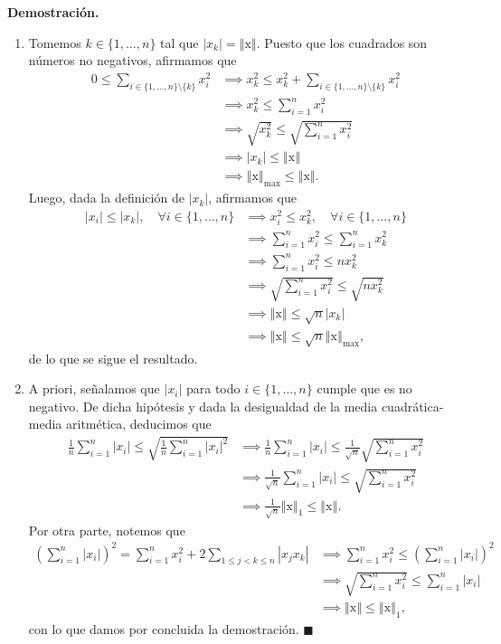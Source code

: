 \documentclass[12pt]{article}
\newcommand{\abs}[1]{\left\vert#1\right\vert}
\newcommand{\norm}[1]{\left\Vert#1\right\Vert}
\newcommand{\x}{\mathrm x}
\begin{document}
\begin{enumerate}
\textbf{Demostración.}
\begin{enumerate}[(1)]
    \item Tomemos $k \in \{1,\ldots,n\}$ tal que $\abs{x_k}=\norm{\x}$. Puesto que los cuadrados son números
    no negativos, afirmamos que
    \begin{align*}
        0 \leq \sum_{i\in \{1,\ldots,n\}\setminus \{k\}}x_{i}^2 &\implies x_k^2 \leq x_k^2 + \sum_{i\in \{1,\ldots,n\}\setminus \{k\}}x_{i}^2 \\
        &\implies x_{k}^2 \leq \sum_{i=1}^{n}x_i^2 \\
        &\implies \sqrt{x_{k}^2} \leq \sqrt{\sum_{i=1}^{n}x_i^2} \\
        &\implies \abs{x_{k}} \leq \norm{\x} \\
        &\implies \norm{\x}_{\max} \leq \norm{\x}.
    \end{align*}
    Luego, dada la definición de $\abs{x_k}$, afirmamos que
    \begin{align*}
        \abs{x_i}\leq \abs{x_k}, \quad \forall i \in \{1,\ldots,n\} &\implies  x_i^2\leq  x_k^2, \quad \forall i \in \{1,\ldots,n\}\\
        &\implies \sum_{i=1}^{n}x_i^2 \leq \sum_{i=1}^{n}x_k^2 \\
        &\implies \sum_{i=1}^{n}x_i^2 \leq nx_k^2 \\
        &\implies \sqrt{\sum_{i=1}^{n}x_i^2} \leq \sqrt{nx_k^2} \\
        &\implies \norm{\x} \leq \sqrt{n}\abs{x_k} \\
        &\implies \norm{\x} \leq \sqrt{n}\norm{\x}_{\max},
    \end{align*}
    de lo que se sigue el resultado.
    \item A priori, señalamos que $\abs{x_i}$ para todo $i \in \{1,\ldots,n\}$ cumple que es no negativo. De dicha hipótesis y dada la desigualdad de la media cuadrática-media
    aritmética, deducimos que
    \begin{align*}
        \frac{1}{n}\sum_{i=1}^{n}\abs{x_i} \leq \sqrt{\frac{1}{n}\sum_{i=1}^{n}\abs{x_i}^2} &\implies \frac{1}{n}\sum_{i=1}^{n}\abs{x_i} \leq \frac{1}{\sqrt{n}}\sqrt{\sum_{i=1}^{n}x_i^2}\\
        &\implies \frac{1}{\sqrt{n}}\sum_{i=1}^{n}\abs{x_i} \leq \sqrt{\sum_{i=1}^{n}x_i^2} \\
        &\implies \frac{1}{\sqrt{n}}\norm{\x}_1 \leq \norm{\x}.
    \end{align*}
    Por otra parte, notemos que
    \begin{align*}
        \left(\sum_{i=1}^{n}\abs{x_i}\right)^2 = \sum_{i=1}^{n}x_i^2 + 2\sum_{1\leq j<k\leq n}\abs{x_jx_k} &\implies \sum_{i=1}^{n}x_i^2 \leq \left(\sum_{i=1}^{n}\abs{x_i}\right)^2\\
        &\implies \sqrt{\sum_{i=1}^{n}x_i^2} \leq \sum_{i=1}^{n}\abs{x_i} \\
        &\implies \norm{\x} \leq \norm{\x}_{1},
    \end{align*}
    con lo que damos por concluida la demostración. $\blacksquare$
\end{enumerate}


\end{enumerate}
\end{document}
